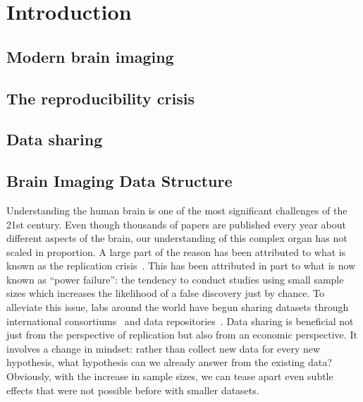 \chapter{Introduction}

\section{Modern brain imaging}
\section{The reproducibility crisis}
\section{Data sharing}
\section{Brain Imaging Data Structure}
Understanding the human brain is one of the most significant challenges of the 21st century. Even though thousands of papers are published every year about different aspects of the brain, our understanding of this complex organ has not scaled in proportion. A large part of the reason has been attributed to what is known as the replication crisis~\citep{ioannidis2005most, simmons2011false, button2013power}. This has been attributed in part to what is now known as ``power failure'': the tendency to conduct studies using small sample sizes which increases the likelihood of a false discovery just by chance. To alleviate this issue, labs around the world have begun sharing datasets through international consortiums~\citep{van2013wu, ollier2005uk} and data repositories~\citep{poldrack2013toward, gorgolewski2015neurovault}. Data sharing is beneficial not just from the perspective of replication but also from an economic perspective. It involves a change in mindset: rather than collect new data for every new hypothesis, what hypothesis can we already answer from the existing data? Obviously, with the increase in sample sizes, we can tease apart even subtle effects that were not possible before with smaller datasets.

